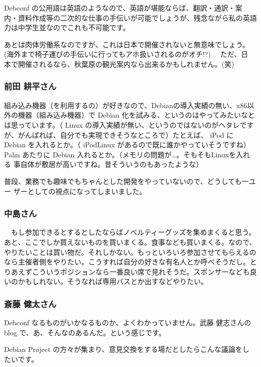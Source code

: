 \documentclass[mingoth,a4paper]{jsarticle}
\begin{document}
    Debconf の公用語は英語のようなので、英語が堪能ならば、翻訳・通訳・案
内・資料作成等の二次的な仕事の手伝いが可能でしょうが、残念ながら私の英語
力は中学生並なのでこれも不可能です。

    あとは肉体労働系なのですが、これは日本で開催されないと無意味でしょう。 
(海外まで椅子運びの手伝いに行ってもアホ扱いされるのがオチ!?) 　ただ、日
本で開催されるなら、秋葉原の観光案内なら出来るかもしれません。(笑)

\subsubsection{前田 耕平さん}

組み込み機器（を利用するの）が好きなので、Debianの導入実績の無い、x86以
外の機器（組み込み機器）で Debian 化を試みる、というのはやってみたいなと
は思っています。（ Linux の導入実績が無い、というのではないのがヘタレです
が、がんばれば、自分でも実現できそうなところで）たとえば、 iPod に 
Debian を入れるとか。（ iPodLinux があるので既に誰かやっていそうですね）
Palm あたりに Debian 入れるとか。（メモリの問題が…。そもそもLinuxを入れる
事自体が敷居が高いですね。昔そういうのもあったような）

普段、業務でも趣味でもちゃんとした開発をやっていないので、どうしても一ユー
ザーとしての視点になってしまいました。

\subsubsection{中島さん}

　もし参加できるとするとしたならばノベルティーグッズを集めまくると思う。
あと、ここでしか買えないものを買いまくる。食事なども買いまくる。なので、
やりたいことは買い物だ。それしかない。もっといろいろ参加させてもらえるの
なら主催者側をやりたい。こうすれば自分の好きな有名人とか呼べそうだし。と
りあえずこういうポジションなら一番良い席で見れそうだ。スポンサーなども良
いのかもしれない。そうなれば専用バスとか出すなどやりたい。

\subsubsection{斎藤 健太さん}

Debconf なるものがいかなるものか、よくわかっていません。武藤 健志さんの
blog で、あ、そんなのあるんだ。という感じです。

Debian Project の方々が集まり、意見交換をする場だとしたらこんな議論をし
たいです。
\end{document}
